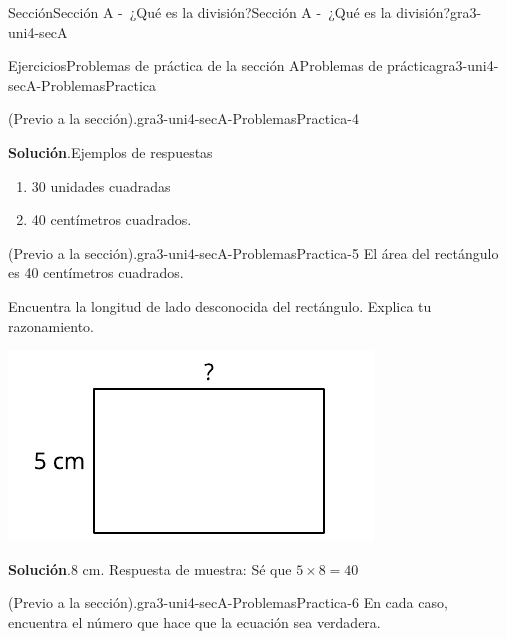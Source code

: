 \documentclass[oneside,10pt,]{article}
\newcommand{\blocktitlefont}{\relax}
\begin{document}
\begin{sectionptx}{Sección}{Sección A -~¿Qué es la división?}{}{Sección A -~¿Qué es la división?}{}{}{gra3-uni4-secA}
\begin{exercises-subsection}{Ejercicios}{Problemas de práctica de la sección A}{}{Problemas de práctica}{}{}{gra3-uni4-secA-ProblemasPractica}
\begin{divisionexercise}{2}{(Previo a la sección).}{}{gra3-uni4-secA-ProblemasPractica-4}
\begin{sidebyside}{2}{0.05}{0.05}{0.1}
\begin{sbspanel}{0.5}
\end{sbspanel}%
\end{sidebyside}%
\par\smallskip%
\noindent\textbf{\blocktitlefont Solución}.\hypertarget{gra3-uni4-secA-ProblemasPractica-4-3}{}\quad{}Ejemplos de respuestas%
%
\begin{enumerate}[label={\Alph*.}]
\item{}30 unidades cuadradas%
\item{}40 centímetros cuadrados.%
\end{enumerate}
\end{divisionexercise}%
\begin{divisionexercise}{3}{(Previo a la sección).}{}{gra3-uni4-secA-ProblemasPractica-5}%
El área del rectángulo es 40 centímetros cuadrados.%
\begin{sidebyside}{2}{0}{0}{0}%
\begin{sbspanel}{0.5}%
Encuentra la longitud de lado desconocida del rectángulo. Explica tu razonamiento.%
\end{sbspanel}%
\begin{sbspanel}{0.5}%
\includegraphics[width=\linewidth]{external/svg-source/tikz-file-151673-scale13.pdf}
\end{sbspanel}%
\end{sidebyside}%
\par\smallskip%
\noindent\textbf{\blocktitlefont Solución}.\hypertarget{gra3-uni4-secA-ProblemasPractica-5-3}{}\quad{}8 cm. Respuesta de muestra: Sé que \(5 \times 8 = 40\)%
\end{divisionexercise}%
\begin{divisionexercise}{4}{(Previo a la sección).}{}{gra3-uni4-secA-ProblemasPractica-6}%
En cada caso, encuentra el número que hace que la ecuación sea verdadera.%
\par
%
\begin{enumerate}[label={(\alph*)}]

\end{enumerate}
\end{divisionexercise}
\end{exercises-subsection}
\end{sectionptx}
\end{document}
